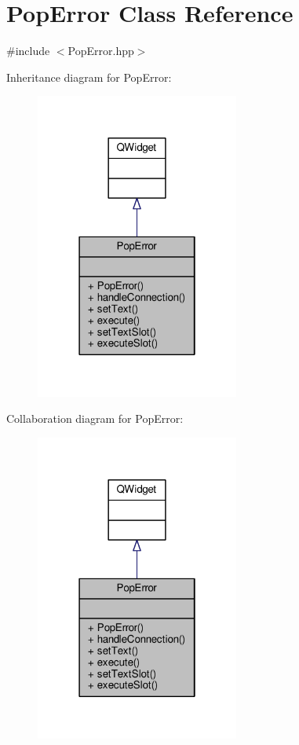 \hypertarget{classPopError}{}\section{Pop\+Error Class Reference}
\label{classPopError}


{\ttfamily \#include $<$Pop\+Error.\+hpp$>$}



Inheritance diagram for Pop\+Error\+:
\nopagebreak
\begin{figure}[H]
\begin{center}
\leavevmode
\includegraphics[width=190pt]{classPopError__inherit__graph}
\end{center}
\end{figure}


Collaboration diagram for Pop\+Error\+:
\nopagebreak
\begin{figure}[H]
\begin{center}
\leavevmode
\includegraphics[width=190pt]{classPopError__coll__graph}
\end{center}
\end{figure}

